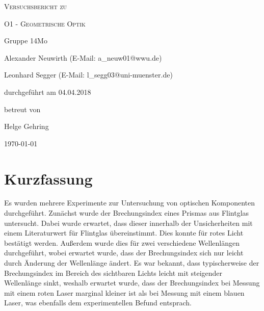\documentclass[
	a4paper,
	12pt,
	pagesize,
	ngerman
]{scrartcl}
\begin{document}
	
	\begin{titlepage}
		\centering
		{\scshape\LARGE Versuchsbericht zu \par}
		\vspace{1cm}
		{\scshape\huge O1 - Geometrische Optik \par}
		\vspace{2.5cm}
		{\LARGE Gruppe 14Mo \par}
		\vspace{0.5cm}
		
		{\large Alexander Neuwirth (E-Mail: a\_neuw01@wwu.de) \par}
		{\large Leonhard Segger (E-Mail: l\_segg03@uni-muenster.de) \par}
		\vfill
		
		durchgeführt am 04.04.2018\par
		betreut von\par
		{\large Helge Gehring} 
		
		\vfill
		
		{\large \today\par}
	\end{titlepage}
	\tableofcontents
	\newpage


	\section{Kurzfassung}
	Es wurden mehrere Experimente zur Untersuchung von optischen Komponenten durchgeführt.
	Zunächst wurde der Brechungsindex eines Prismas aus Flintglas untersucht.
	Dabei wurde erwartet, dass dieser innerhalb der Unsicherheiten mit einem Literaturwert für Flintglas übereinstimmt.
	Dies konnte für rotes Licht bestätigt werden.
	Außerdem wurde dies für zwei verschiedene Wellenlängen durchgeführt, wobei erwartet wurde, dass der Brechungsindex sich nur leicht durch Änderung der Wellenlänge ändert.
	Es war bekannt, dass typischerweise der Brechungsindex im Bereich des sichtbaren Lichts leicht mit steigender Wellenlänge sinkt, weshalb erwartet wurde, dass der Brechungsindex bei Messung mit einem roten Laser marginal kleiner ist als bei Messung mit einem blauen Laser, was ebenfalls dem experimentellen Befund entsprach.
	
\end{document}
